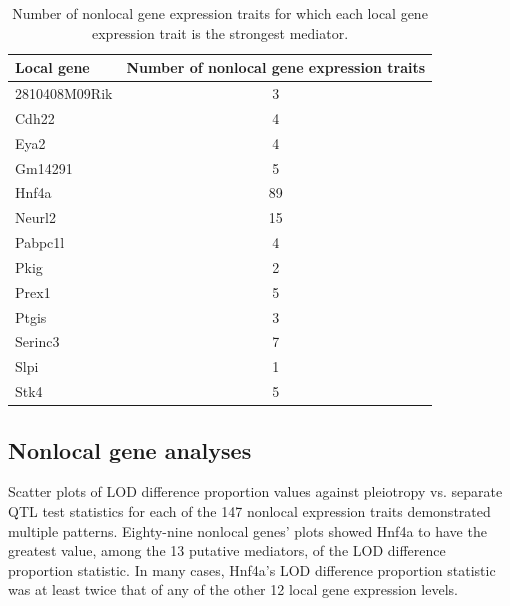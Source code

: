 \documentclass{article}
\begin{document}
\begin{boehm}
\begin{table}[ht]
\centering
\begin{tabular}{lc}
  \hline
 Local gene & Number of nonlocal gene expression traits \\
  \hline
2810408M09Rik &   3 \\
  Cdh22 &   4 \\
  Eya2 &   4 \\
  Gm14291 &   5 \\
  Hnf4a &  89 \\
  Neurl2 &  15 \\
  Pabpc1l &   4 \\
  Pkig &   2 \\
  Prex1 &   5 \\
  Ptgis &   3 \\
  Serinc3 &   7 \\
  Slpi &   1 \\
  Stk4 &   5 \\
   \hline
\end{tabular}
\caption{Number of nonlocal gene expression traits for which each local gene expression trait is the strongest mediator.}
\label{tab:med-count}
\end{table}

\subsection{Nonlocal gene analyses}

Scatter plots of LOD difference proportion values against pleiotropy vs. separate QTL test statistics for each of the 147 nonlocal expression traits demonstrated multiple patterns. Eighty-nine nonlocal genes' plots showed Hnf4a to have the greatest value, among the 13 putative mediators, of the LOD difference proportion statistic. In many cases, Hnf4a's LOD difference proportion statistic was at least twice that of any of the other 12 local gene expression levels.


\end{boehm}
\end{document}

